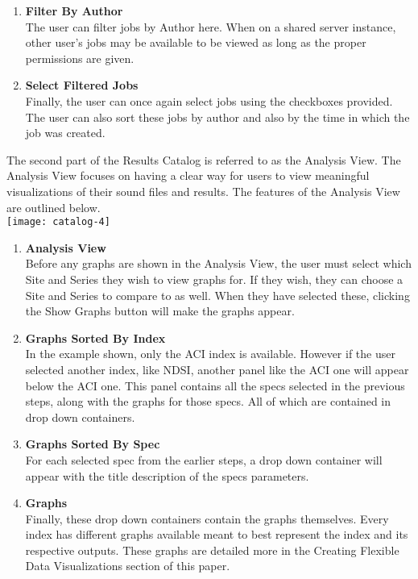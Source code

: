 \begin{enumerate}
    \item \textbf{Filter By Author}\\ The user can filter jobs by Author here. When on a shared server instance, other user's jobs may be available to be viewed as long as the proper permissions are given.
    \item \textbf{Select Filtered Jobs}\\ Finally, the user can once again select jobs using the checkboxes provided. The user can also sort these jobs by author and also by the time in which the job was created.
\end{enumerate}
The second part of the Results Catalog is referred to as the Analysis View. The Analysis View focuses on having a clear way for users to view meaningful visualizations of their sound files and results. The features of the Analysis View are outlined below.\\
\texttt{[image: catalog-4]}
\begin{enumerate}
  \item \textbf{Analysis View}\\ Before any graphs are shown in the Analysis View, the user must select which Site and Series they wish to view graphs for. If they wish, they can choose a Site and Series to compare to as well. When they have selected these, clicking the Show Graphs button will make the graphs appear.
  \item \textbf{Graphs Sorted By Index}\\ In the example shown, only the ACI index is available. However if the user selected another index, like NDSI, another panel like the ACI one will appear below the ACI one. This panel contains all the specs selected in the previous steps, along with the graphs for those specs. All of which are contained in drop down containers.
  \item \textbf{Graphs Sorted By Spec}\\ For each selected spec from the earlier steps, a drop down container will appear with the title description of the spec\textquotesingle s parameters.
  \item \textbf{Graphs}\\ Finally, these drop down containers contain the graphs themselves. Every index has different graphs available meant to best represent the index and its respective outputs. These graphs are detailed more in the Creating Flexible Data Visualizations section of this paper.
\end{enumerate}
